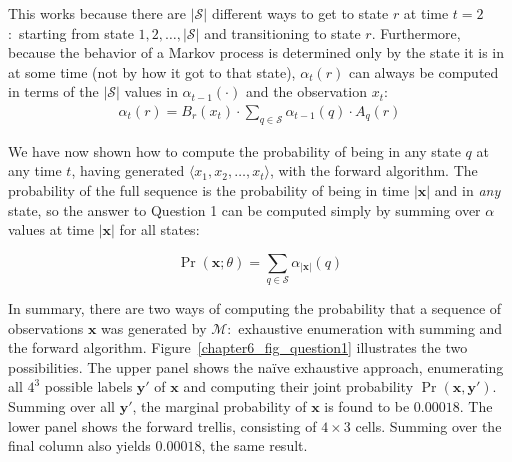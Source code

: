 \noindent This works because there are $|\mathcal{S}|$ different ways
to get to state $r$ at time $t=2$:\ starting from state
$1,2,\ldots,|\mathcal{S}|$ and transitioning to state $r$.
Furthermore, because the behavior of a Markov process is determined
only by the state it is in at some time (not by how it got to that
state), $\alpha_t(r)$ can always be computed in terms of the
$|\mathcal{S}|$ values in $\alpha_{t-1}(\cdot)$ and the observation
$x_t$:
\begin{align}
\alpha_t(r) = B_r(x_t) \cdot \sum_{q \in \mathcal{S}} \alpha_{t-1}(q) \cdot A_q(r)
\end{align}

\noindent We have now shown how to compute the probability of being in
any state $q$ at any time $t$, having generated $\langle x_1, x_2,
\ldots , x_t \rangle$, with the forward algorithm.  The probability of
the full sequence is the probability of being in time $|\textbf{x}|$
and in \emph{any} state, so the answer to Question 1 can be computed
simply by summing over $\alpha$ values at time $|\textbf{x}|$ for all
states:

\begin{equation}
\Pr(\textbf{x};\theta) = \sum_{q \in \mathcal{S}} \alpha_{|\textbf{x}|}(q)
\end{equation}

\noindent In summary, there are two ways of computing the probability
that a sequence of observations $\textbf{x}$ was generated by
$\mathcal{M}$:\ exhaustive enumeration with summing and the forward
algorithm.  Figure~\ref{chapter6_fig_question1} illustrates the two
possibilities.  The upper panel shows the na\"{i}ve exhaustive
approach, enumerating all $4^3$ possible labels $\textbf{y}'$ of
$\textbf{x}$ and computing their joint probability
$\Pr(\textbf{x},\textbf{y}')$.  Summing over all $\textbf{y}'$, the
marginal probability of $\textbf{x}$ is found to be $0.00018$. The
lower panel shows the forward trellis, consisting of $4 \times 3$
cells.  Summing over the final column also yields $0.00018$, the same
result.

